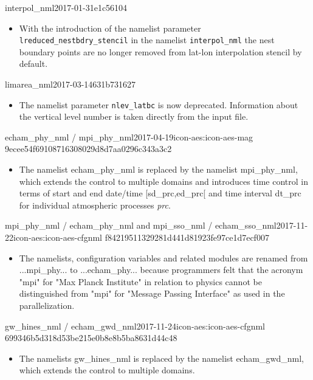 \begin{changeitem}{interpol\_nml}{2017-01-31}{e1c56104}
  \begin{itemize}
   \item With the introduction of the namelist parameter
     \texttt{lreduced\_nestbdry\_stencil} in the namelist
     \texttt{interpol\_nml} the nest boundary points are no longer
     removed from lat-lon interpolation stencil by default.
  \end{itemize}
\end{changeitem}

\begin{changeitem}{limarea\_nml}{2017-03-14}{631b731627}
  \begin{itemize}
   \item The namelist parameter \texttt{nlev\_latbc} is now
     deprecated. Information about the vertical level number is taken
     directly from the input file.
  \end{itemize}
\end{changeitem}

\begin{changeitem}{echam\_phy\_nml / mpi\_phy\_nml}{2017-04-19}{icon-aes:icon-aes-mag 9ecee54f69108716308029d8d7aa0296c343a3c2}
  \begin{itemize}
   \item The namelist echam\_phy\_nml is replaced by the namelist mpi\_phy\_nml, which extends the control to multiple domains and introduces time control in terms of start and end date/time [sd\_prc,ed\_prc[ and time interval dt\_prc for individual atmospheric processes \textit{prc}.
  \end{itemize}
\end{changeitem}

\begin{changeitem}{mpi\_phy\_nml / echam\_phy\_nml and mpi\_sso\_nml / echam\_sso\_nml}{2017-11-22}{icon-aes:icon-aes-cfgnml f84219511329281d441d81923fe97ce1d7ecf007}
  \begin{itemize}
   \item The namelists, configuration variables and related modules are renamed
from ...mpi\_phy... to ...echam\_phy... because programmers felt that the acronym "mpi"  for "Max Planck Institute" in relation to physics cannot be distinguished from "mpi" for "Message Passing Interface" as used in the parallelization.
  \end{itemize}
\end{changeitem}

\begin{changeitem}{gw\_hines\_nml / echam\_gwd\_nml}{2017-11-24}{icon-aes:icon-aes-cfgnml 699346b5d318d53be215e0b8e8b5ba8631d44c48}
  \begin{itemize}
   \item The namelists gw\_hines\_nml is replaced by the namelist echam\_gwd\_nml, which extends the control to multiple domains.
  \end{itemize}
\end{changeitem}

